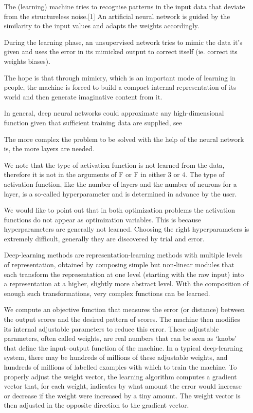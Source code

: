 The (learning) machine tries to recognise patterns in the input data that deviate from the structureless noise.[1] An artificial neural network is guided by the similarity to the input values and adapts the weights accordingly.

During the learning phase, an unsupervised network tries to mimic the data it's given and uses the error in its mimicked output to correct itself (ie. correct its weights  biases).

The hope is that through mimicry, which is an important mode of learning in people, the machine is forced to build a compact internal representation of its world and then generate imaginative content from it.


In general, deep neural networks could approximate any high-dimensional function given that sufficient training data are supplied, see \cite{ArzaniDawson:2021}


The more complex the problem to be solved with the help of the neural network is, the more layers are needed. 

We note that the type of activation function is not learned from the data, therefore it is not in the arguments of F or F in either 3 or 4. The type of activation function, like the number of layers and the number of neurons for a layer, is a so-called hyperparameter and is determined in advance by the user. 

We would like to point out that in both optimization problems the activation functions do not appear as optimization variables. This is because hyperparameters are generally not learned. 
Choosing the right hyperparameters is extremely difficult, generally they are discovered by trial and error. 


Deep-learning methods are representation-learning methods with multiple levels of representation, obtained by composing simple but non-linear modules that each transform the representation at one level (starting with the raw input) into a representation at a higher, slightly more abstract level. With the composition of enough such transformations, very complex functions can be learned.


We compute an objective function that measures the error (or distance) between the output scores and the desired pattern of scores. The machine then modifies its internal adjustable parameters to reduce  this error. These adjustable parameters, often called weights, are real numbers that can be seen as ‘knobs’ that define the input–output function of the machine. In a typical deep-learning system, there may be hundreds of millions of these adjustable weights, and hundreds of millions of labelled examples with which to train the machine. To properly adjust the weight vector, the learning algorithm computes a gradient vector that, for each weight, indicates by what amount the error would increase or decrease if the weight were increased by a tiny amount. The weight vector is then adjusted in the opposite direction to the gradient vector. 

